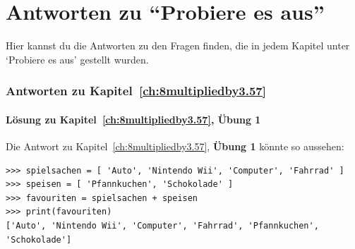

\chapter{Antworten zu ``Probiere es aus''}\label{app:answers}

Hier kannst du die Antworten zu den Fragen finden, die in jedem Kapitel unter `Probiere es aus' gestellt wurden.

\subsection*{Antworten zu Kapitel~\ref{ch:8multipliedby3.57}}

\subsubsection{Lösung zu Kapitel~\ref{ch:8multipliedby3.57}, Übung 1}
Die Antwort zu Kapitel~\ref{ch:8multipliedby3.57}, \textbf{Übung 1} könnte so aussehen:

\begin{Verbatim}[frame=single]
>>> spielsachen = [ 'Auto', 'Nintendo Wii', 'Computer', 'Fahrrad' ]
>>> speisen = [ 'Pfannkuchen', 'Schokolade' ]
>>> favouriten = spielsachen + speisen
>>> print(favouriten)
['Auto', 'Nintendo Wii', 'Computer', 'Fahrrad', 'Pfannkuchen', 'Schokolade']
\end{Verbatim}

